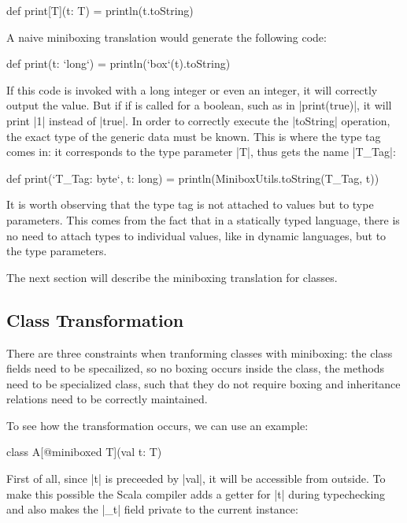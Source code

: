 \begin{lstlisting-nobreak}
 def print[T](t: T) = println(t.toString)
\end{lstlisting-nobreak}

A naive miniboxing translation would generate the following code:

\begin{lstlisting-nobreak}
 def print(t: `long`) = println(`box`(t).toString)
\end{lstlisting-nobreak}

If this code is invoked with a long integer or even an integer, it will correctly output the value. But if if is called for a boolean, such as in |print(true)|, it will print |1| instead of |true|. In order to correctly execute the |toString| operation, the exact type of the generic data must be known. This is where the type tag comes in: it corresponds to the type parameter |T|, thus gets the name |T_Tag|:

\begin{lstlisting-nobreak}
 def print(`T_Tag: byte`, t: long) =
     println(MiniboxUtils.toString(T_Tag, t))
\end{lstlisting-nobreak}

It is worth observing that the type tag is not attached to values but to type parameters. This comes from the fact that in a statically typed language, there is no need to attach types to individual values, like in dynamic languages, but to the type parameters.

The next section will describe the miniboxing translation for classes.

\subsection{Class Transformation}

There are three constraints when tranforming classes with miniboxing: the class fields need to be specailized, so no boxing occurs inside the class, the methods need to be specialized class, such that they do not require boxing and inheritance relations need to be correctly maintained.

To see how the transformation occurs, we can use an example:

\begin{lstlisting-nobreak}
 class A[@miniboxed T](val t: T)
\end{lstlisting-nobreak}

First of all, since |t| is preceeded by |val|, it will be accessible from outside. To make this possible the Scala compiler adds a getter for |t| during typechecking and also makes the |_t| field private to the current instance:

